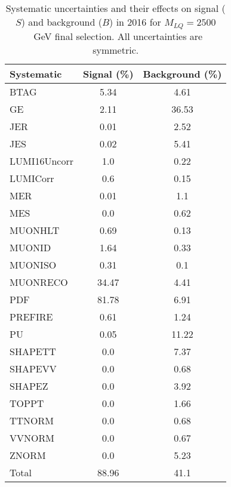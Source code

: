 \begin{table}[htbp]
\begin{center}
\caption{Systematic uncertainties and their effects on signal ($S$) and background ($B$) in 2016 for $M_{LQ}=2500$~GeV final selection. All uncertainties are symmetric.}
\begin{tabular}{lcc}
\hline\hline
Systematic & Signal (\%) & Background (\%) \\ \hline 
BTAG & 5.34 & 4.61\\ 
GE & 2.11 & 36.53\\ 
JER & 0.01 & 2.52\\ 
JES & 0.02 & 5.41\\ 
LUMI16Uncorr & 1.0 & 0.22\\ 
LUMICorr & 0.6 & 0.15\\ 
MER & 0.01 & 1.1\\ 
MES & 0.0 & 0.62\\ 
MUONHLT & 0.69 & 0.13\\ 
MUONID & 1.64 & 0.33\\ 
MUONISO & 0.31 & 0.1\\ 
MUONRECO & 34.47 & 4.41\\ 
PDF & 81.78 & 6.91\\ 
PREFIRE & 0.61 & 1.24\\ 
PU & 0.05 & 11.22\\ 
SHAPETT & 0.0 & 7.37\\ 
SHAPEVV & 0.0 & 0.68\\ 
SHAPEZ & 0.0 & 3.92\\ 
TOPPT & 0.0 & 1.66\\ 
TTNORM & 0.0 & 0.68\\ 
VVNORM & 0.0 & 0.67\\ 
ZNORM & 0.0 & 5.23\\ 
Total & 88.96 & 41.1\\ \hline \hline
\end{tabular}
\label{tab:SysUncertainties_uujj_2500}
\end{center}
\end{table}

